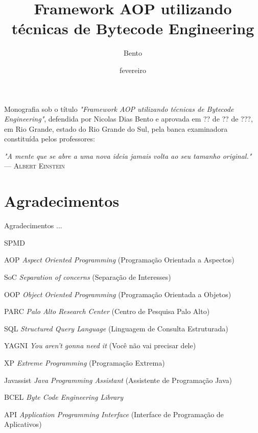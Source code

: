 \documentclass[tc,openright]{iiufrgs}
\title{Framework AOP utilizando técnicas de Bytecode Engineering}
\author{Bento}{Nicolas}
\date{fevereiro}{2014}
\begin{document}
\maketitle

\begin{folhadeaprovacao}
Monografia sob o título \textit{"Framework AOP utilizando técnicas de Bytecode Engineering"}, defendida por Nicolas Dias Bento e aprovada em ?? de ?? de ???, em Rio Grande, estado do Rio Grande do Sul, pela banca examinadora constituída pelos professores:
\end{folhadeaprovacao}

\clearpage

\begin{flushright}
\mbox{}\vfill
{\sffamily\itshape
"A mente que se abre a uma nova ideia jamais volta ao seu tamanho original."\\}
--- \textsc{Albert Einstein}
\end{flushright}

\chapter*{Agradecimentos}

Agradecimentos ...

\tableofcontents

\begin{listofabbrv}{SPMD}
	\item[AOP] \textit{Aspect Oriented Programming} (Programação Orientada a Aspectos)
	\item[SoC] \textit{Separation of concerns} (Separação de Interesses)
	\item[OOP] \textit{Object Oriented Programming} (Programação Orientada a Objetos)
	\item[PARC] \textit{Palo Alto Research Center} (Centro de Pesquisa Palo Alto) 
	\item[SQL] \textit{Structured Query Language} (Linguagem de Consulta Estruturada)
	\item[YAGNI] \textit{You aren’t gonna need it} (Você não vai precisar dele)
	\item[XP] \textit{Extreme Programming} (Programação Extrema)
	\item[Javassist] \textit{Java Programming Assistant} (Assistente de Programação Java)
	\item[BCEL] \textit{Byte Code Engineering Library}
	\item[API] \textit{Application Programming Interface} (Interface de Programação de Aplicativos)
\end{listofabbrv}
\end{document}
